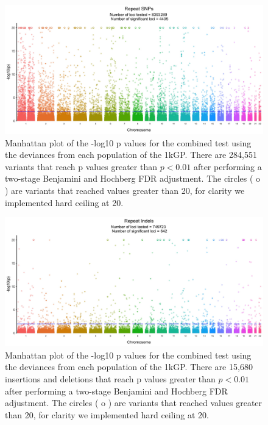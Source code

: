 \documentclass[9pt,lineno]{elife}
\begin{document}
\begin{figure}[h]
\includegraphics[width=\hsize,keepaspectratio]{./Figures/ManhattanPlot_Repeat_SNPs.jpg}

\caption{Manhattan plot of the -log10 p values for the combined test using the deviances from each population of the 1kGP. 
There are 284,551 variants that reach p values greater than $ p < 0.01$ after performing a two-stage Benjamini and Hochberg FDR adjustment. 
The circles ( o ) are variants that reached values greater than 20, for clarity we implemented hard ceiling at 20.}
\label{RS_Manhattan}
\end{figure}

\begin{figure}[h]
\includegraphics[width=\hsize,keepaspectratio]{./Figures/ManhattanPlot_Repeat_Indels.jpg}

\caption{Manhattan plot of the -log10 p values for the combined test using the deviances from each population of the 1kGP. 
There are 15,680 insertions and deletions that reach p values greater than $ p < 0.01$ after performing a two-stage Benjamini and Hochberg FDR adjustment. 
The circles ( o ) are variants that reached values greater than 20, for clarity we implemented hard ceiling at 20.}
 \label{RI_Manhattan}
\end{figure}
\end{document}
